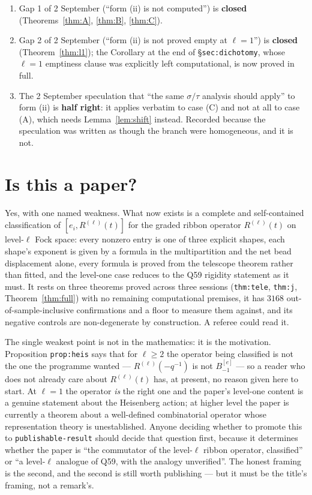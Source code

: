 \documentclass[11pt]{article}
\theoremstyle{definition}
\theoremstyle{remark}
\begin{document}
\begin{enumerate}
\item Gap 1 of 2 September (``form (ii) is not computed'') is \textbf{closed}
(Theorems~\ref{thm:A}, \ref{thm:B}, \ref{thm:C}).
\item Gap 2 of 2 September (``form (ii) is not proved empty at $\ell=1$'') is
\textbf{closed} (Theorem~\ref{thm:l1}); the Corollary at the end of
\S\texttt{sec:dichotomy}, whose $\ell=1$ emptiness clause was explicitly left
computational, is now proved in full.
\item The 2 September speculation that ``the same $\sigma/\tau$ analysis should apply''
to form (ii) is \textbf{half right}: it applies verbatim to case (C) and not at all to
case (A), which needs Lemma~\ref{lem:shift} instead. Recorded because the speculation was
written as though the branch were homogeneous, and it is not.
\end{enumerate}

\section*{Is this a paper?}

Yes, with one named weakness. What now exists is a complete and self-contained
classification of $[e_i,R^{(\ell)}(t)]$ for the graded ribbon operator
$R^{(\ell)}(t)$ on level-$\ell$ Fock space: every nonzero entry is one of three explicit
shapes, each shape's exponent is given by a formula in the multipartition and the net
bead displacement alone, every formula is proved from the telescope theorem rather than
fitted, and the level-one case reduces to the Q59 rigidity statement as it must. It rests
on three theorems proved across three sessions (\texttt{thm:tele}, \texttt{thm:j},
Theorem~\ref{thm:full}) with no remaining computational premises, it has $3168$
out-of-sample-inclusive confirmations and a floor to measure them against, and its
negative controls are non-degenerate by construction. A referee could read it.

The single weakest point is not in the mathematics: it is the motivation. Proposition
\texttt{prop:heis} says that for $\ell\ge2$ the operator being classified is not the one
the programme wanted --- $R^{(\ell)}(-q^{-1})$ is not $B^{[e]}_{-1}$ --- so a reader who
does not already care about $R^{(\ell)}(t)$ has, at present, no reason given here to
start. At $\ell=1$ the operator \emph{is} the right one and the paper's level-one content
is a genuine statement about the Heisenberg action; at higher level the paper is
currently a theorem about a well-defined combinatorial operator whose representation
theory is unestablished. Anyone deciding whether to promote this to
\texttt{publishable-result} should decide that question first, because it determines
whether the paper is ``the commutator of the level-$\ell$ ribbon operator, classified''
or ``a level-$\ell$ analogue of Q59, with the analogy unverified''. The honest framing is
the second, and the second is still worth publishing --- but it must be the title's
framing, not a remark's.
\end{document}
